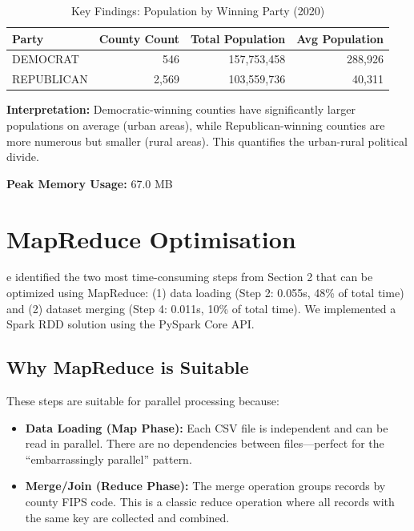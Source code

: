 \documentclass[9pt,a4paper,onecolumn,twoside]{tau-class/tau}
\begin{document}
\begin{table}[htbp]
\centering
\caption{Key Findings: Population by Winning Party (2020)}
\label{tab:findings}
\begin{tabular}{lrrr}
\hline
Party & County Count & Total Population & Avg Population \\
\hline
DEMOCRAT & 546 & 157,753,458 & 288,926 \\
REPUBLICAN & 2,569 & 103,559,736 & 40,311 \\
\hline
\end{tabular}
\end{table}

\textbf{Interpretation:} Democratic-winning counties have significantly larger populations on average (urban areas), while Republican-winning counties are more numerous but smaller (rural areas). This quantifies the urban-rural political divide.

\textbf{Peak Memory Usage:} 67.0 MB


\section{MapReduce Optimisation}

e identified the two most time-consuming steps from Section 2 that can be optimized using MapReduce: (1) data loading (Step 2: 0.055s, 48\% of total time) and (2) dataset merging (Step 4: 0.011s, 10\% of total time). We implemented a Spark RDD solution using the PySpark Core API.

\subsection{Why MapReduce is Suitable}

These steps are suitable for parallel processing because:

\begin{itemize}
    \item \textbf{Data Loading (Map Phase):} Each CSV file is independent and can be read in parallel. There are no dependencies between files---perfect for the ``embarrassingly parallel'' pattern.
    \item \textbf{Merge/Join (Reduce Phase):} The merge operation groups records by county FIPS code. This is a classic reduce operation where all records with the same key are collected and combined.
\end{itemize}
\end{document}

